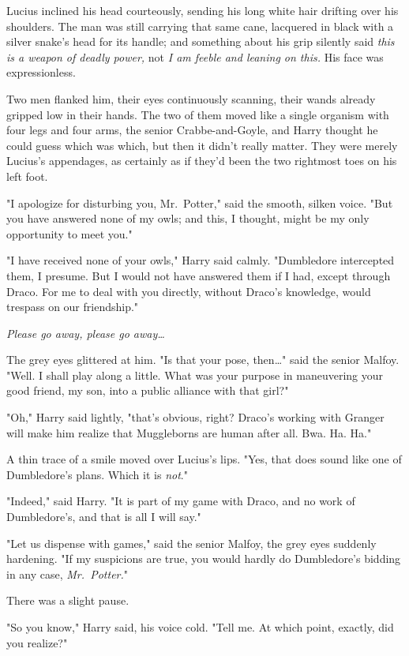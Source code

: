 Lucius inclined his head courteously, sending his long white hair drifting over
his shoulders. The man was still carrying that same cane, lacquered in black
with a silver snake's head for its handle; and something about his grip
silently said \emph{this is a weapon of deadly power,} not \emph{I am feeble
and leaning on this.} His face was expressionless.

Two men flanked him, their eyes continuously scanning, their wands already
gripped low in their hands. The two of them moved like a single organism with
four legs and four arms, the senior Crabbe-and-Goyle, and Harry thought he
could guess which was which, but then it didn't really matter. They were merely
Lucius's appendages, as certainly as if they'd been the two rightmost toes on
his left foot.

"I apologize for disturbing you, Mr.~Potter," said the smooth, silken voice.
"But you have answered none of my owls; and this, I thought, might be my only
opportunity to meet you."

"I have received none of your owls," Harry said calmly. "Dumbledore intercepted
them, I presume. But I would not have answered them if I had, except through
Draco. For me to deal with you directly, without Draco's knowledge, would
trespass on our friendship."

\emph{Please go away, please go away{\ldots}}

The grey eyes glittered at him. "Is that your pose, then{\ldots}" said the
senior Malfoy. "Well. I shall play along a little. What was your purpose in
maneuvering your good friend, my son, into a public alliance with that girl?"

"Oh," Harry said lightly, "that's obvious, right? Draco's working with Granger
will make him realize that Muggleborns are human after all. Bwa. Ha. Ha."

A thin trace of a smile moved over Lucius's lips. "Yes, that does sound like
one of Dumbledore's plans. Which it is \emph{not}."

"Indeed," said Harry. "It is part of my game with Draco, and no work of
Dumbledore's, and that is all I will say."

"Let us dispense with games," said the senior Malfoy, the grey eyes suddenly
hardening. "If my suspicions are true, you would hardly do Dumbledore's bidding
in any case, \emph{Mr.~Potter.}"

There was a slight pause.

"So you know," Harry said, his voice cold. "Tell me. At which point, exactly,
did you realize?"

